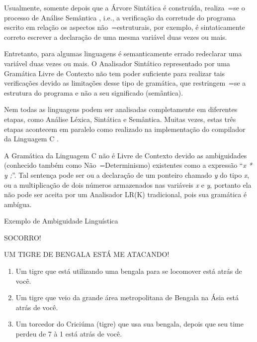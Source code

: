 {    Usualmente,
    somente depois que a Árvore Sintática é construída,
    realiza~=se o processo de Análise Semântica \cite{ahoCompilerDragonBook},
    i.e.,
    a verificação da corretude do programa escrito em relação os aspectos não~=estruturais,
    por exemplo,
    é sintaticamente correto escrever a declaração de uma mesma variável duas vezes ou
    mais.

    Entretanto,
    para algumas linguagens é semanticamente errado redeclarar uma variável duas vezes ou
    mais.
    O Analisador Sintático representado por uma Gramática Livre de Contexto não tem poder suficiente para realizar tais verificações devido as limitações desse tipo de gramática,
    que restringem~=se a estrutura do programa e
    não a seu significado (semântica).

    Nem todas as linguagens podem ser analisadas completamente em diferentes etapas,
    como Análise Léxica, Sintática e Semântica. Muitas vezes,
    estas três etapas acontecem em paralelo como realizado na implementação do compilador da Linguagem C \cite{jourdan2017,whyCcannotBeParsedWithALR1Parser}.

    A Gramática da Linguagem C não é Livre de Contexto devido as ambiguidades (conhecido também como Não~=Determinismo) existentes como a expressão ``\textit{x * y ;}''.
    Tal sentença pode ser ou
    a declaração de um ponteiro chamado \textit{y} do tipo \textit{x},
    ou a multiplicação de dois números armazenados nas variáveis \textit{x} e
    \textit{y},
    portanto ela não pode ser aceita por um Analisador LR(K) tradicional,
    pois sua gramática é ambígua.

\vspace{4mm}
\begin{quadro}[h]
\caption{Exemplo de Ambiguidade Linguística}
\begin{bluebox}
    SOCORRO!

    UM TIGRE DE BENGALA ESTÁ ME ATACANDO!

    \vspace{-1mm}
    \begin{enumerate}%
        \item Um tigre que está utilizando uma bengala para se locomover está atrás de você.
        \item Um tigre que veio da grande área metropolitana de Bengala na Ásia está atrás de você.
        \item Um torcedor do Criciúma (tigre) que usa sua bengala,
        depois que seu time perdeu de 7 à 1 está atrás de você.
    \end{enumerate}
\end{bluebox}
\end{quadro}

}
